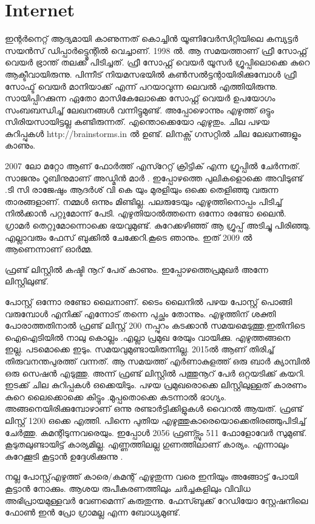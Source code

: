 \documentclass[10pt,a4paper]{report}
\begin{document}
\section{Internet}
ഇന്റർനെറ്റ് ആദ്യമായി കാണുന്നത് കൊച്ചിൻ യൂണിവേർസിറ്റിയിലെ കമ്പ്യട്ടർ സയൻസ് ഡിപ്പാർട്ട്മെന്റിൽ വെച്ചാണ്. 1998 ൽ. ആ സമയത്താണ് ഫ്രീ സോഫ്റ്റ് വെയർ ഭ്രാന്ത് തലക്ക് പിടിച്ചത്. ഫ്രീ സോഫ്റ്റ് വെയർ യൂസർ ഗ്രൂപ്പിലൊക്കെ കുറെ ആക്ടീവായിരുന്നു. പിന്നീട് നിയമസഭയിൽ കൺസൽട്ടന്റായിരിക്കുമ്പോൾ ഫ്രീ സോഫ്ട് വെയർ മാനിയാക്ക് എന്ന് പറയാവുന്ന ലെവൽ എത്തിയിരുന്നു. സായിപ്പിറക്കുന്ന ഏതോ മാസികേലോക്കെ സോഫ്റ്റ് വെയർ ഉപയോഗം സംബബന്ധിച്ച് ലേഖനങ്ങൾ വന്നിട്ടുമുണ്ട്. അപ്പോഴൊന്നും എഴുത്ത് ഒട്ടും സിരിയസായിട്ടല്ല കണ്ടിരുന്നത്. എന്തൊക്കെയോ എഴുതും.
ചില പഴയ കുറിപ്പുകൾ http://brainstorms.in ൽ ഉണ്ട്. ലിനക്സ് ഗസറ്റിൽ ചില ലേഖനങ്ങളും കാണും.

2007 ലോ മറ്റോ ആണ് ഫോർത്ത് എസ്റേറ്റ് ക്രിട്ടിക് എന്ന ഗ്രൂപ്പിൽ ചേർന്നത്. സാജനും റൂബിനുമാണ് അഡ്മിൻ മാർ . ഇപ്പോഴത്തെ പുലികളൊക്കെ അവിടുണ്ട് .ടി സി രാജേഷും ആദർശ് വി കെ യും മുരളിയും ഒക്കെ തെളിഞ്ഞു വരുന്ന താരങ്ങളാണ്. നമ്മൾ ഒന്നും മിണ്ടില്ല. പലരുടേയും എഴുത്തിനൊപ്പം പിടിച്ച് നിൽക്കാൻ പറ്റുമോന്ന് പേടി. എഴുതിയാൽത്തന്നെ ഒന്നോ രണ്ടോ ലൈൻ. ഗ്രാമർ തെറ്റുമോന്നൊക്കെ ഭയവുമുണ്ട്. കുറേക്കഴിഞ്ഞ് ആ ഗ്രൂപ്പ് അടിച്ചു പിരിഞ്ഞു. എല്ലാവരും ഫേസ് ബുക്കിൽ ചേക്കേറി.കൂടെ ഞാനും. ഇത് 2009 ൽ ആണെന്നാണ്‌ ഓർമ്മ.

ഫ്രണ്ട് ലിസ്റ്റിൽ കഷ്ടി നൂറ് പേര് കാണും. ഇപ്പോഴത്തെപ്രമുഖർ അന്നേ ലിസ്റ്റിലുണ്ട്.

പോസ്റ്റ് ഒന്നോ രണ്ടോ ലൈനാണ്. ടൈം ലൈനിൽ പഴയ പോസ്റ്റ് പൊങ്ങി വരുമ്പോൾ എനിക്ക് എന്നോട് തന്നെ പുച്ഛം തോന്നും. എഴുത്തിന് ശക്തി പോരാത്തതിനാൽ ഫ്രണ്ട് ലിസ്റ്റ് 200 നപ്പുറം കടക്കാൻ സമയമെടുത്തു.ഇതിനിടെ ഐഐടിയിൽ നാലു കൊല്ലം .എല്ലാ പ്രമുഖ രേയും വായിക്കു. എഴുത്തങ്ങനെ ഇല്ല. പടമൊക്കെ ഇടും. സമയവുമുണ്ടായിരുന്നില്ല.
2015ൽ ആണ് തിരിച്ച് തിരുവനന്തപുരത്ത് വന്നത്. ആ സമയത്ത് എർണാകുളത്ത് ഒരു ബാർ ക്യാമ്പിൽ ഒരു സെഷൻ എടുത്തു. അന്ന് ഫ്രണ്ട് ലിസ്റ്റിൽ പത്തുനൂറ് പേർ ഒറ്റയടിക്ക് കയറി. ഇടക്ക് ചില കുറിപ്പകൾ ഒക്കെയിടും. പഴയ പ്രമുഖരൊക്കെ ലിസ്റ്റിലുള്ളത് കാരണം കുറെ ലൈക്കൊക്കെ കിട്ടും .മുപ്പതൊക്കെ കടന്നാൽ ഭാഗ്യം. അങ്ങനെയിരിക്കുമ്പോഴാണ് ഒന്നു രണ്ടാർട്ടിക്കിളുകൾ വൈറൽ ആയത്. ഫ്രണ്ട് ലിസ്റ്റ് 1200 ഒക്കെ എത്തി.
പിന്നെ പുതിയ എഴുത്തുകാരെയൊക്കെതിരഞ്ഞുപിടിച്ച് ചേർത്തു. കമന്റിടുന്നവരെയും. ഇപ്പോൾ 2056 ഫ്രണ്ട്സും 511 ഫോളോവേർ സുമുണ്ട്. കൂടുതലുണ്ടായിട്ട് കാര്യമില്ല. എണ്ണത്തിലല്ല ഗുണത്തിലാണ് കാര്യം. എന്നാലും കുറേക്കൂടി കൂട്ടാൻ ഉദ്ദേശിക്കുന്നു .

നല്ല പോസ്റ്റ്എഴുത്ത് കാരെ/കമന്റ് എഴുതുന്ന വരെ ഇനിയും അങ്ങോട്ട് പോയി കൂട്ടാൻ നോക്കും. ആശയ രുപീകരണത്തിലും ചർച്ചകളിലും വിവിധ അഭിപ്രായമുള്ളവർ
വേണമെന്ന് കരുതുന്നു. ഫേസ്ബുക്ക് റേഡിയോ സ്റ്റേഷനിലെ ഫോൺ ഇൻ പ്രോ ഗ്രാമല്ല എന്ന ബോധ്യമുണ്ട്.
\end{document}
